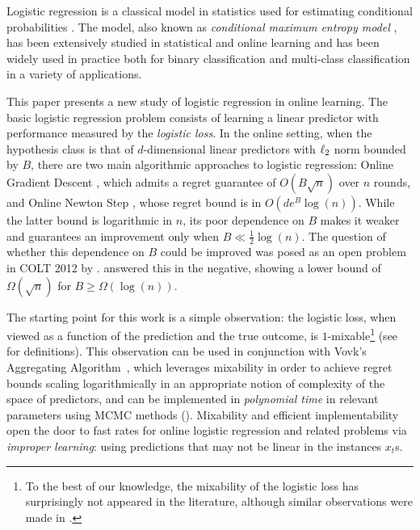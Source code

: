 
Logistic regression is a classical model in statistics used for
estimating conditional probabilities \citep{Berkson1944}. The model,
also known as \emph{conditional maximum entropy model}
\citep{BergerDellaPietraDellaPietra1996}, has been extensively studied
in statistical and online learning and has been widely used in
practice both for binary classification and multi-class
classification in a variety of applications.

This paper presents a new study of logistic regression in online
learning.  The basic logistic regression problem consists of learning a
linear predictor with performance measured by the \emph{logistic loss}. In the online setting, when
the hypothesis class is that of $d$-dimensional linear predictors with
$\ell_{2}$ norm bounded by $B$, there are two main algorithmic
approaches to logistic regression: Online Gradient Descent \citep{Zinkevich03,shalev2007convex,nemirovski2009robust}, which
admits a regret guarantee of $O(B\sqrt{n})$ over $n$ rounds, and
Online Newton Step \citep{hazan2007logarithmic}, whose regret bound is in $O(de^{B}\log(n))$. While
the latter bound is logarithmic in $n$, its poor dependence on
$B$ makes it weaker and guarantees an improvement only when $B \ll \frac{1}{2}\log(n)$. The question of whether this dependence on $B$ could be improved was posed as an open problem in COLT 2012 by \citet{mcmahan2012open}. \citet{hazan2014logistic} answered this in the negative, showing a lower bound of $\Omega(\sqrt{n})$ for $B\geq{}\Omega(\log(n))$.

The starting point for this work is a simple observation: the logistic loss, when viewed as a function of the prediction and the true outcome, is $1$-mixable\footnote{To the best of our knowledge, the mixability of the logistic loss has surprisingly not appeared in the literature, although similar observations were made in \citep{kakade2005online}.} (see  for definitions). This observation can be used in conjunction with Vovk's Aggregating Algorithm~\citep{vovk1995game}, which leverages mixability in order to achieve regret bounds scaling logarithmically in an appropriate notion of complexity of the space of predictors, and can be implemented in \emph{polynomial time} in relevant parameters using MCMC methods (). Mixability and efficient implementability open the door to fast rates for online logistic regression and related problems via \emph{improper learning}: using predictions that may not be linear in the instances $x_{t}$s.

